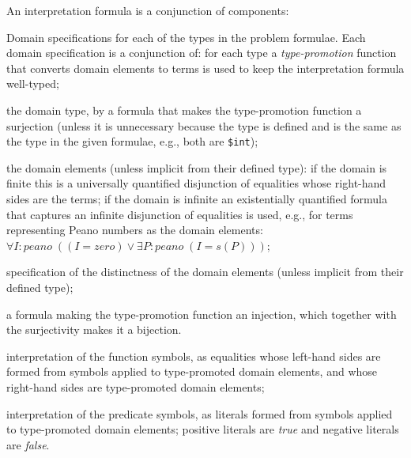 \documentclass{easychair}
\newcommand{\smalltt}[1]{\small \texttt{#1}}
\newenvironment{packed_itemize}{
\vspace*{-0.2em}
\begin{itemize}
\setlength{\partopsep}{0pt}
\setlength{\itemsep}{1pt}
\setlength{\parskip}{0pt}
\setlength{\parsep}{0pt}
}{\end{itemize}}
\begin{document}
An interpretation formula is a conjunction of components:
\begin{packed_itemize}
\item Domain specifications for each of the types in the problem formulae.
      Each domain specification is a 
      conjunction of:
      for each type a {\em type-promotion} function that converts domain elements to terms is
      used to keep the interpretation formula well-typed; 
      \begin{packed_itemize}
      \item the domain type, by a formula that makes the type-promotion function a surjection 
            (unless it is unnecessary because the type is defined and is the same as the type in 
            the given formulae, e.g., both are {\smalltt{\$int}});
      \item the domain elements (unless implicit from their defined type): if the domain is
            finite this is a universally quantified disjunction of equalities whose right-hand 
            sides are the terms; if the domain is infinite an existentially quantified formula 
            that captures an infinite disjunction of equalities is used, e.g., for terms 
            representing Peano numbers as the domain elements:\\
            \hspace*{0.5cm}$\forall I{:}peano\;((I = zero) \vee \exists P{:}peano\;(I = s(P)))$;
      \item specification of the distinctness of the domain elements (unless implicit from their
            defined type);
      \item a formula making the type-promotion function an injection,
            which together with the surjectivity makes it a bijection.
      \end{packed_itemize}
\item interpretation of the function symbols, as equalities whose left-hand sides are 
      formed from symbols applied to type-promoted domain elements, and whose right-hand sides 
      are type-promoted domain elements;
\item interpretation of the predicate symbols, as literals formed from symbols applied
      to type-promoted domain elements; positive literals are {\em true} and negative literals 
      are {\em false}.
\end{packed_itemize}
\end{document}
